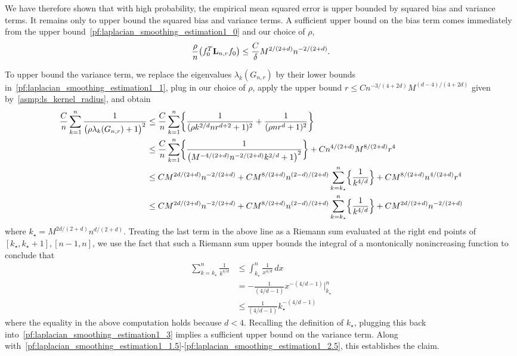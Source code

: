 \documentclass{article}
\newcommand{\1}{\mathbf{1}}
\newcommand{\Lap}{{\bf L}}
\theoremstyle{alden}
\theoremstyle{aldenthm}
\theoremstyle{definition}
\theoremstyle{remark}
\begin{document}
We have therefore shown that with high probability, the empirical mean squared error is upper bounded by squared bias and variance terms. It remains only to upper bound the squared bias and variance terms. A sufficient upper bound on the bias term comes immediately from the upper bound~\ref{pf:laplacian_smoothing_estimation1_0} and our choice of $\rho$,
\begin{equation}
\label{pf:laplacian_smoothing_estimation1_2.5}
\frac{\rho}{n} \bigl(f_0^T \Lap_{{n,r}} f_0\bigr) \leq \frac{C}{\delta} M^{2/(2+d)} n^{-2/(2 + d)}.
\end{equation}

To upper bound the variance term, we replace the eigenvalues $\lambda_k(G_{n,r})$ by their lower bounds in~\ref{pf:laplacian_smoothing_estimation1_1}, plug in our choice of $\rho$, apply the upper bound $r \leq C n^{-3/(4 + 2d)} M^{(d - 4)/(4 + 2d)}$ given by~\ref{asmp:ls_kernel_radius}, and obtain
\begin{align}
\frac{C}{n}\sum_{k = 1}^{n} \frac{1}{\bigl(\rho \lambda_{k}(G_{n,r}) + 1\bigr)^2} & \leq \frac{C}{n}\sum_{k = 1}^{n} \biggl\{\frac{1}{(\rho k^{2/d} n r^{d + 2} + 1)^2} + \frac{1}{(\rho n r^{d} + 1)^2} \biggr\} \nonumber \\
& \leq \frac{C}{n}\sum_{k = 1}^{n} \biggl\{\frac{1}{\bigl(M^{-4/(2 + d)}n^{-2/(2+d)}k^{2/d} + 1\bigr)^2}\biggr\} + Cn^{4/(2 + d)}M^{8/(2+d)}r^{4} \nonumber \\
& \leq CM^{2d/(2 + d)} n^{-2/(2 + d)} + CM^{8/(2 + d)}n^{(2 - d)/(2 + d)} \sum_{k = k_{\star}}^{n} \Bigl\{\frac{1}{k^{4/d}}\Bigr\}  + CM^{8/(2 + d)}n^{4/(2 + d)}r^4 \nonumber \\
& \leq  CM^{2d/(2 + d)} n^{-2/(2 + d)} + CM^{8/(2 + d)}n^{(2 - d)/(2 + d)} \sum_{k = k_{\star}}^{n} \Bigl\{\frac{1}{k^{4/d}}\Bigr\}  + CM^{2d/(2 + d)}n^{-2/(2 + d)} \label{pf:laplacian_smoothing_estimation1_3}
\end{align}
where $k_{\star} = M^{2d/(2 + d)}n^{d/(2 + d)}$. Treating the last term in the above line as a Riemann sum evaluated at the right end points of $[k_{\star},k_{\star} + 1], [n - 1,n]$, we use the fact that such a Riemann sum upper bounds the integral of a montonically nonincreasing function to conclude that
\begin{align*}
\sum_{k = k_{\star}}^{n} \frac{1}{k^{4/d}} & \leq \int_{k_{\star}}^{n} \frac{1}{x^{4/d}} \,dx \\
& = - \frac{1}{(4/d - 1)} x^{-(4/d - 1)} \Big|_{k_{\star}}^{n} \\
& \leq \frac{1}{(4/d - 1)} k_{\star}^{-(4/d - 1)}
\end{align*}
where the equality in the above computation holds because $d < 4$. Recalling the definition of $k_{\star}$, plugging this back into~\eqref{pf:laplacian_smoothing_estimation1_3} implies a sufficient upper bound on the variance term. Along with~\eqref{pf:laplacian_smoothing_estimation1_1.5}-\eqref{pf:laplacian_smoothing_estimation1_2.5}, this establishes the claim.
\end{document}
